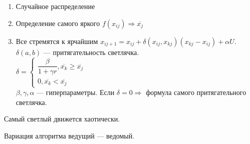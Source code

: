 \documentclass[12pt]{article}
\begin{document}
\begin{enumerate}
    \item Случайное распределение
    \item Определение самого яркого $f(x_{ij}) \Rightarrow \overline{x_j}$
    \item Все стремятся к ярчайшим
          $x_{ij+1} = x_{ij} + \delta(x_{ij}, x_{kj})(x_{kj}-x_{ij}) + \alpha U$. $\delta(a, b)$ — притягательность светлячка.\\
          $\delta = \begin{cases}
                  \dfrac{\beta}{1 + \gamma r}, \overline{x_k} \geq \overline{x_j} \\
                  0, \overline{x_k} < \overline{x_j}
              \end{cases}$ \\
          $\beta, \gamma, \alpha$ — гиперпараметры. Если $\delta = 0 \Rightarrow$ формула самого притягательного светлячка.
\end{enumerate}

Самый светлый движется хаотически.

Вариация алгоритма ведущий — ведомый.
\end{document}
